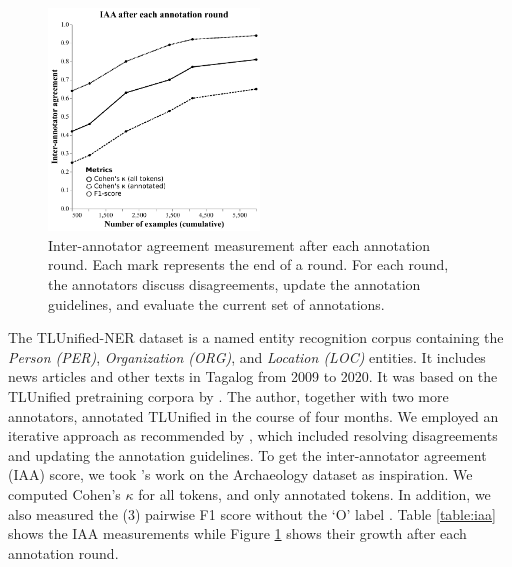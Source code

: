 \documentclass[11pt]{article}
\begin{document}


\begin{figure}[t]
\centering
\includegraphics[width=0.5\textwidth]{images/iaa}
\caption{
  Inter-annotator agreement measurement after each annotation round.
  Each mark represents the end of a round. 
  For each round, the annotators discuss disagreements, update the annotation guidelines, and evaluate the current set of annotations.
}
\label{fig:iaa}
\end{figure}

The TLUnified-NER dataset is a named entity recognition corpus containing the \textit{Person (PER)}, \textit{Organization (ORG)}, and \textit{Location  (LOC)} entities.
It includes news articles and other texts in Tagalog from 2009 to 2020.
It was based on the TLUnified pretraining corpora by \cite{Cruz2021ImprovingLL}.
The author, together with two more annotators, annotated TLUnified in the course of four months.
We employed an iterative approach as recommended by \citet{Reiter2017HT}, which included resolving disagreements and updating the annotation guidelines.
To get the inter-annotator agreement (IAA) score, we took \citet{Brandsen2020CreatingAD}'s work on the Archaeology dataset as inspiration.
We computed Cohen's $\kappa$ for all tokens, and only annotated tokens.  
In addition, we also measured the (3) pairwise F1 score without the `O' label \citep{Deleger2012BG}.
Table \ref{table:iaa} shows the IAA measurements while Figure \ref{fig:iaa} shows their growth after each annotation round.
\end{document}
